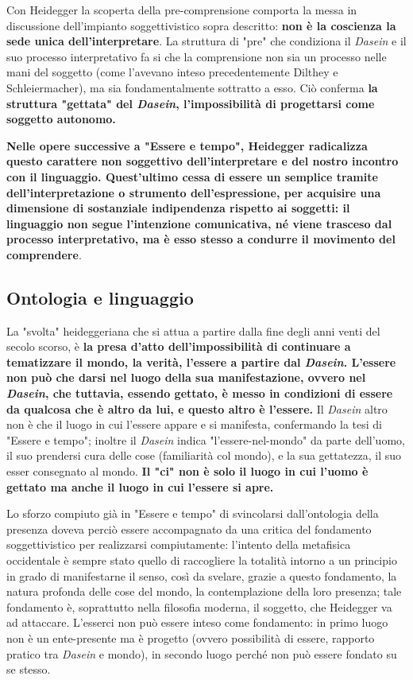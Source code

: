 Con Heidegger la scoperta della pre-comprensione comporta
la messa in discussione dell'impianto soggettivistico
sopra descritto: \textbf{non è la coscienza la sede unica dell'interpretare}. La struttura di "pre" che condiziona
il \textit{Dasein} e il suo processo interpretativo fa si che
la comprensione non sia un processo nelle mani del
soggetto (come l'avevano inteso precedentemente Dilthey e
Schleiermacher), ma sia fondamentalmente sottratto a
esso. Ciò conferma \textbf{la struttura "gettata" del
\textit{Dasein}, l'impossibilità di progettarsi come soggetto
autonomo.}

\textbf{Nelle opere successive a "Essere e tempo",
Heidegger radicalizza questo carattere non
soggettivo dell'interpretare e del nostro incontro
con il linguaggio. Quest'ultimo cessa di essere
un semplice tramite dell'interpretazione o strumento
dell'espressione, per acquisire una dimensione di
sostanziale indipendenza rispetto ai soggetti: il linguaggio
non segue l'intenzione comunicativa, né viene
trasceso dal processo interpretativo, ma è esso stesso a
condurre il movimento del comprendere}.

\subsection{Ontologia e linguaggio}

La "svolta" heideggeriana che si attua a partire
dalla fine degli anni venti del secolo scorso, è \textbf{la
presa d'atto dell'impossibilità di continuare a
tematizzare il mondo, la verità, l'essere a partire
dal \textit{Dasein}. L'essere non può che darsi nel luogo della
sua manifestazione, ovvero nel \textit{Dasein}, che tuttavia,
essendo gettato, è messo in condizioni di essere da
qualcosa che è altro da lui, e questo altro è l'essere.}
Il \textit{Dasein} altro non è che il luogo in cui l'essere appare
e si manifesta, confermando la tesi di "Essere e tempo";
inoltre il \textit{Dasein} indica "l'essere-nel-mondo" da parte
dell'uomo, il suo prendersi cura delle cose (familiarità
col mondo), e la sua gettatezza, il suo esser consegnato
al mondo. \textbf{Il "ci" non è solo il luogo in cui
l'uomo è gettato ma anche il luogo in cui l'essere si apre.}

Lo sforzo compiuto già in "Essere e tempo" di svincolarsi
dall'ontologia della presenza doveva perciò essere accompagnato da una critica del fondamento soggettivistico per
realizzarsi compiutamente: l'intento della metafisica
occidentale è sempre stato quello di raccogliere la
totalità intorno a un principio in grado
di manifestarne il senso, così da svelare, grazie a
questo fondamento, la natura profonda delle cose del
mondo, la contemplazione della loro presenza; tale
fondamento è, soprattutto nella filosofia moderna, il
soggetto, che Heidegger va ad attaccare.
L'esserci non può essere inteso come fondamento: in
primo luogo non è un ente-presente ma è progetto
(ovvero possibilità di essere, rapporto pratico tra \textit{Dasein} e mondo), in secondo luogo
perché non può essere fondato su se stesso.

